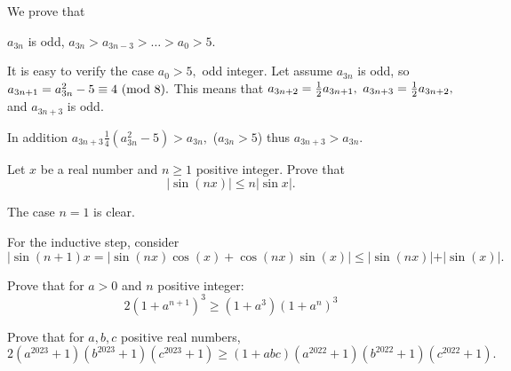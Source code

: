 \documentclass{article}
\begin{document}
\begin{soln}
    We prove that 
    \begin{claim*}
        $a_{3n}$ is odd, $a_{3n} > a_{3n-3} > \ldots > a_0 > 5.$
    \end{claim*}
    \begin{subproof}
        It is easy to verify the case $a_0 > 5,$ odd integer.
        Let assume $a_{3n}$ is odd, so $a_{3n + 1} = a_{3n}^2 - 5 \equiv 4 \ (\mathrm{mod}\ 8).$
        This means that $a_{3n+2} = \frac{1}{2} a_{3n + 1},$ $a_{3n + 3} = \frac{1}{2} a_{3n + 2},$ and
        $a_{3n + 3}$ is odd.

        In addition $a_{3n + 3} \frac{1}{4} (a_{3n}^2 - 5) > a_{3n},$ ($a_{3n} > 5$)
        thus $a_{3n + 3} > a_{3n}.$
    \end{subproof}
\end{soln}

\begin{problem}
    Let $x$ be a real number and $n \ge 1$ positive integer. Prove that
    \[ 
        | \sin {(nx)} | \le n |\sin{x}|.
    \]
\end{problem}

\begin{soln}
    The case $n=1$ is clear.

    For the inductive step, consider
    \[
        |\sin(n+1)x = |\sin(nx)\cos(x) + \cos(nx)\sin(x)| \le |\sin(nx)| + |\sin(x)|.
    \]
\end{soln}

\begin{problem}
    Prove that for $a > 0$ and $n$ positive integer:
    \[ 
        2(1 + a^{n+1})^3 \ge (1+a^3) (1+a^n)^3
    \]

    Prove that for $a,b,c$ positive real numbers,
    \[
        2(a^{2023} + 1)(b^{2023} + 1)(c^{2023} + 1) \ge (1+abc)(a^{2022} + 1)(b^{2022} + 1)(c^{2022} + 1).
    \]
\end{problem}
\end{document}
